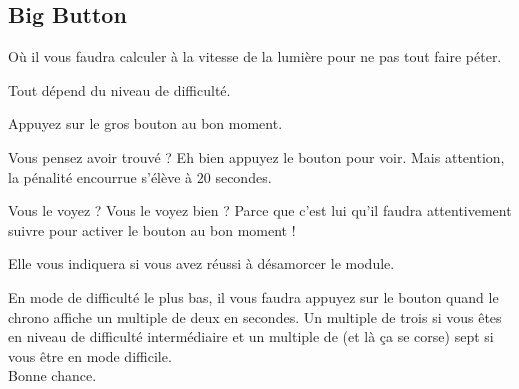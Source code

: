 \subsection{Big Button}
Où il vous faudra calculer à la vitesse de la lumière pour ne pas tout faire
péter.
\vspace{.5cm}
\begin{modulebox}{}
  \begin{moduleaction}[Difficulté]
    Tout dépend du niveau de difficulté.
  \end{moduleaction}
  \begin{moduleaction}
    Appuyez sur le gros bouton au bon moment.
  \end{moduleaction}
  \begin{moduleaction}[bouton]
    Vous pensez avoir trouvé ? Eh bien appuyez le bouton pour voir. Mais
    attention, la pénalité encourrue s'élève à $20$ secondes.
  \end{moduleaction}
  \begin{moduleaction}[timer]
    Vous le voyez ? Vous le voyez bien ? Parce que c'est lui qu'il faudra attentivement
    suivre pour activer le bouton au bon moment !
  \end{moduleaction}
  \begin{moduleaction}
    Elle vous indiquera si vous avez réussi à désamorcer le module.
  \end{moduleaction}
\end{modulebox}
\vspace{.5cm}

En mode de difficulté le plus bas, il vous faudra appuyez sur le bouton quand le
chrono affiche un multiple de deux en secondes. Un multiple de trois si vous
êtes en niveau de difficulté intermédiaire et un multiple de (et là ça se corse)
sept si vous être en mode difficile. \\
Bonne chance.
\newpage
